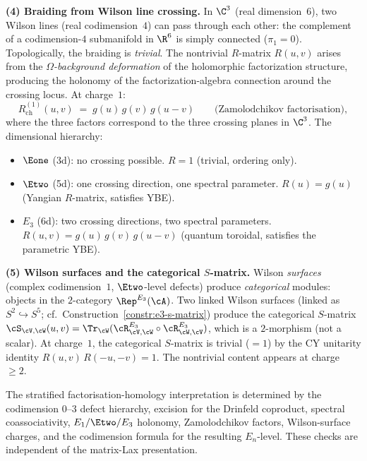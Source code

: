 \medskip
\noindent\textbf{(4) Braiding from Wilson line crossing.}
In $\C^3$ (real dimension~$6$), two Wilson lines (real
codimension~$4$) can pass through each other: the complement of
a codimension-$4$ submanifold in $\R^6$ is simply connected
($\pi_1 = 0$). Topologically, the braiding is \emph{trivial}.
The nontrivial $R$-matrix $R(u,v)$ arises from the
\emph{$\Omega$-background deformation} of the holomorphic
factorization structure, producing the holonomy of the
factorization-algebra connection around the crossing locus.
At charge~$1$:
\[
 R_{\mathrm{ch}}^{(1)}(u,v) \;=\; g(u)\, g(v)\, g(u-v)
 \qquad\text{(Zamolodchikov factorisation)},
\]
where the three factors correspond to the three crossing planes
in $\C^3$. The dimensional hierarchy:
\begin{itemize}
 \item $\Eone$ (3d): no crossing possible.
 $R = 1$ (trivial, ordering only).
 \item $\Etwo$ (5d): one crossing direction, one spectral parameter.
 $R(u) = g(u)$ (Yangian $R$-matrix, satisfies YBE).
 \item $E_3$ (6d): two crossing directions, two spectral parameters.
 $R(u,v) = g(u)\,g(v)\,g(u{-}v)$ (quantum toroidal, satisfies the
 parametric YBE).
\end{itemize}

\medskip
\noindent\textbf{(5) Wilson surfaces and the categorical $S$-matrix.}
Wilson \emph{surfaces} (complex codimension~$1$, $\Etwo$-level defects)
produce \emph{categorical} modules: objects in the $2$-category
$\Rep^{E_3}(\cA)$. Two linked Wilson surfaces (linked as
$S^2 \hookrightarrow S^5$; cf.\ Construction~\ref{constr:e3-s-matrix})
produce the categorical $S$-matrix $\cS_{\cV,\cW}(u,v) =
\Tr_{\cW}(\cR^{E_3}_{\cV,\cW} \circ \cR^{E_3}_{\cW,\cV})$, which
is a $2$-morphism (not a scalar). At charge~$1$, the categorical
$S$-matrix is trivial ($= 1$) by the CY unitarity identity
$R(u,v)\, R(-u,-v) = 1$. The nontrivial content appears at
charge~$\geq 2$.

\begin{remark}
\label{rem:wilson-stratified-fh-data}
The stratified factorisation-homology interpretation is determined by the
codimension $0$--$3$ defect hierarchy, excision for the Drinfeld
coproduct, spectral coassociativity, $E_1/\Etwo/E_3$ holonomy,
Zamolodchikov factors, Wilson-surface charges, and the codimension
formula for the resulting $E_n$-level.  These checks are independent of
the matrix-Lax presentation.
\end{remark}


